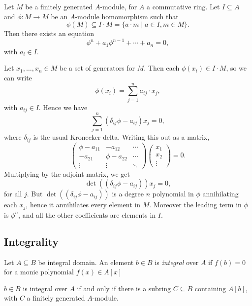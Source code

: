 \documentclass[12pt]{article}
\begin{document}
\begin{lemma}
	Let $M$ be a finitely generated $A$-module, for $A$ a commutative ring. Let $I \subseteq A$ and $\phi : M \to M$ be an $A$-module homomorphism such that
	\[
		\phi(M) \subseteq I \cdot M = \{a \cdot m \mid a \in I, m \in M\}.
	\]
	Then there exists an equation
	\[
	\phi^n + a_1 \phi^{n-1} + \cdots + a_n = 0,
	\]
	with $a_i \in I$.
\end{lemma}

\begin{proofbox}
	Let $x_1, \ldots, x_n \in M$ be a set of generators for $M$. Then each $\phi(x_i) \in I \cdot M$, so we can write
	\[
	\phi(x_i) = \sum_{j = 1}^n a_{ij} \cdot x_j,
	\]
	with $a_{ij} \in I$. Hence we have
	\[
	\sum_{j = 1}^n (\delta_{ij} \phi - a_{ij}) x_j = 0,
	\]
	where $\delta_{ij}$ is the usual Kronecker delta. Writing this out as a matrix,
	\[
	\begin{pmatrix}
		\phi - a_{11} & -a_{12} & \cdots \\
		-a_{21} & \phi - a_{22} & \cdots \\
		\vdots & \vdots & \ddots
	\end{pmatrix}
	\begin{pmatrix}
		x_1 \\ x_2 \\ \vdots
	\end{pmatrix} = 0.
	\]
	Multiplying by the adjoint matrix, we get
	\[
	\det((\delta_{ij} \phi - a_{ij})) x_j = 0,
	\]
	for all $j$. But $\det((\delta_{ij}\phi - a_{ij}))$ is a degree $n$ polynomial in $\phi$ annihilating each $x_j$, hence it annihilates every element in $M$. Moreover the leading term in $\phi$ is $\phi^{n}$, and all the other coefficients are elements in $I$.
\end{proofbox}

\subsection{Integrality}
\label{sub:integ}

\begin{definition}
	Let $A \subseteq B$ be integral domain. An element $b \in B$ is \emph{integral} over $A$ if $f(b) = 0$ for a monic polynomial $f(x) \in A[x]$
\end{definition}

\begin{proposition}
	$b \in B$ is integral over $A$ if and only if there is a subring $C \subseteq B$ containing $A[b]$, with $C$ a finitely generated $A$-module.
\end{proposition}
\end{document}
